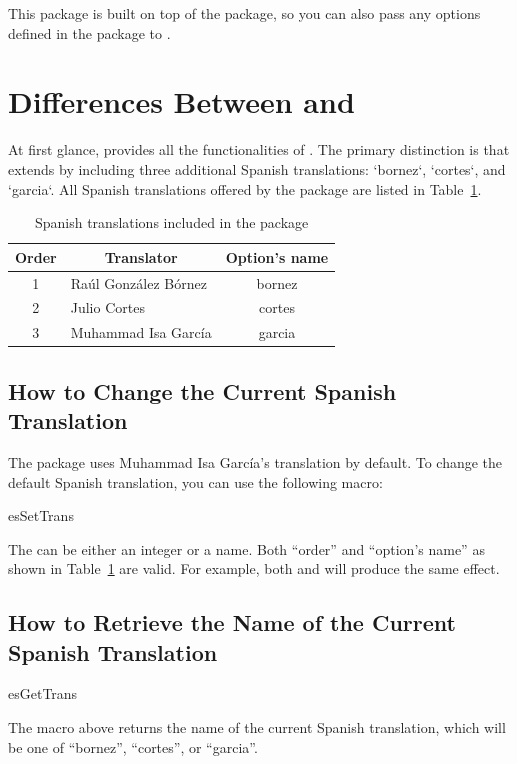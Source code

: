 \documentclass[a4paper]{ltxdoc}
\begin{document}
This package is built on top of the  package, 
so you can also pass any options defined in the  package to .


\section{Differences Between  and }

At first glance,  provides all the functionalities of . 
The primary distinction is that  extends  by including three additional Spanish translations: 
`bornez`, `cortes`, and `garcia`. All Spanish translations offered by the package are listed in Table~\ref{tab:estrans}.




\begin{table}[!htbp]
\centering
\begin{tabular}{|c|l|c|}
    \toprule
    Order & \multicolumn{1}{c|}{Translator} & Option's name \\\midrule
    1 & Raúl González Bórnez & bornez \\
    2 & 	Julio Cortes & cortes \\
    3 & 	Muhammad Isa García & garcia \\
    \bottomrule
\end{tabular}
    \caption{Spanish translations included in the package}
    \label{tab:estrans}
\end{table}

\subsection{How to Change the Current Spanish Translation}
    The  package uses Muhammad Isa García's translation by default.
    To change the default Spanish translation, you can use the following macro:
    \begin{declcs}{esSetTrans}
    \end{declcs}
    The  can be either an integer or a name. Both ``order'' and ``option’s name'' 
    as shown in Table~\ref{tab:estrans} are valid. 
    For example, both  and  will produce the same effect.


\subsection{How to Retrieve the Name of the Current Spanish Translation}
    \begin{declcs}{esGetTrans}
    \end{declcs}
    The macro above returns the name of the current Spanish translation, which will be one of ``bornez'', ``cortes'', or ``garcia''.
\end{document}
